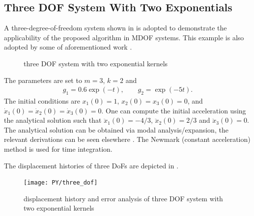 \subsection{Three DOF System With Two Exponentials}
A three-degree-of-freedom system shown in  is adopted to demonstrate the applicability of the proposed algorithm in MDOF systems. This example is also adopted by some of aforementioned work \cite[see, e.g.,][]{Adhikari2004,Cortes2009,Shen2019,Liu2023}.
\begin{figure}[H]
\centering
{}
\caption{three DOF system with two exponential kernels}\label{fig:three_dof}
\end{figure}
The parameters are set to $m=3$, $k=2$ and
\begin{gather}
g_1=\num{0.6}\exp\left(-t\right),\qquad
g_2=\exp\left(-\num{5}t\right).
\end{gather}
The initial conditions are $x_1\left(0\right)=1$, $x_2\left(0\right)=x_3\left(0\right)=0$, and $\dot{x}_1\left(0\right)=\dot{x}_2\left(0\right)=\dot{x}_3\left(0\right)=0$. One can compute the initial acceleration using the analytical solution such that $\ddot{x}_1\left(0\right)=-4/3$, $\ddot{x}_2\left(0\right)=2/3$ and $\ddot{x}_3\left(0\right)=0$.
The analytical solution can be obtained via modal analysis/expansion, the relevant derivations can be seen elsewhere \citep[see][\S~4.6.2]{Adhikari2014}.
The Newmark (constant acceleration) method is used for time integration.

The displacement histories of three DoFs are depicted in .
\begin{figure}[H]
\centering
\texttt{[image: PY/three\_dof]}
\caption{displacement history and error analysis of three DOF system with two exponential kernels}\label{fig:three}
\end{figure}


